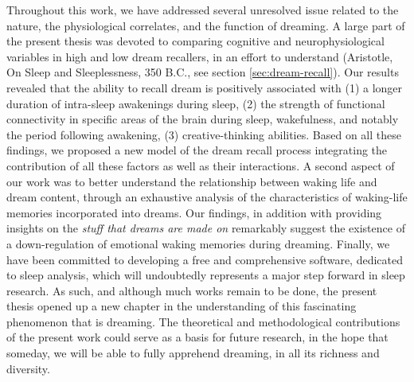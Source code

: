 Throughout this work, we have addressed several unresolved issue related to the nature, the physiological correlates, and the function of dreaming. A large part of the present thesis was devoted to comparing cognitive and neurophysiological variables in high and low dream recallers, in an effort to understand  (Aristotle, On Sleep and Sleeplessness, 350 B.C., see section \ref{sec:dream-recall}). Our results revealed that the ability to recall dream is positively associated with (1) a longer duration of intra-sleep awakenings during sleep, (2) the strength of functional connectivity in specific areas of the brain during sleep, wakefulness, and notably the period following awakening, (3) creative-thinking abilities. Based on all these findings, we proposed a new model of the dream recall process integrating the contribution of all these factors as well as their interactions. A second aspect of our work was to better understand the relationship between waking life and dream content, through an exhaustive analysis of the characteristics of waking-life memories incorporated into dreams. Our findings, in addition with providing insights on the \emph{stuff that dreams are made on} remarkably suggest the existence of a down-regulation of emotional waking memories during dreaming. Finally, we have been committed to developing a free and comprehensive software, dedicated to sleep analysis, which will undoubtedly represents a major step forward in sleep research. As such, and although much works remain to be done, the present thesis opened up a new chapter in the understanding of this fascinating phenomenon that is dreaming. The theoretical and methodological contributions of the present work could serve as a basis for future research, in the hope that someday, we will be able to fully apprehend dreaming, in all its richness and diversity.
